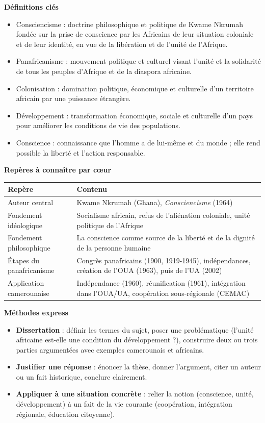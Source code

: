 \documentclass[11pt]{article}
\newcommand{\cle}[1]{{\popxbold\color{popdark}#1}}
\begin{document}
\begin{aretenir}
\textbf{Définitions clés}
\begin{itemize}
  \item \cle{Consciencisme} : doctrine philosophique et politique de Kwame Nkrumah fondée sur la prise de conscience par les Africains de leur situation coloniale et de leur identité, en vue de la libération et de l'unité de l'Afrique.
  \item \cle{Panafricanisme} : mouvement politique et culturel visant l'unité et la solidarité de tous les peuples d'Afrique et de la diaspora africaine.
  \item \cle{Colonisation} : domination politique, économique et culturelle d'un territoire africain par une puissance étrangère.
  \item \cle{Développement} : transformation économique, sociale et culturelle d'un pays pour améliorer les conditions de vie des populations.
  \item \cle{Conscience} : connaissance que l'homme a de lui-même et du monde ; elle rend possible la liberté et l'action responsable.
\end{itemize}

\textbf{Repères à connaître par c\oe ur}
\begin{center}
\begin{tabularx}{\linewidth}{|l|X|}\hline
\rowcolor{popblueL} \textbf{Repère} & \textbf{Contenu} \\ \hline
Auteur central & Kwame Nkrumah (Ghana), \emph{Consciencisme} (1964) \\ \hline
Fondement idéologique & Socialisme africain, refus de l'aliénation coloniale, unité politique de l'Afrique \\ \hline
Fondement philosophique & La conscience comme source de la liberté et de la dignité de la personne humaine \\ \hline
Étapes du panafricanisme & Congrès panafricains (1900, 1919-1945), indépendances, création de l'OUA (1963), puis de l'UA (2002) \\ \hline
Application camerounaise & Indépendance (1960), réunification (1961), intégration dans l'OUA/UA, coopération sous-régionale (CEMAC) \\ \hline
\end{tabularx}
\end{center}

\textbf{Méthodes express}
\begin{itemize}
  \item \textbf{Dissertation} : définir les termes du sujet, poser une problématique (l'unité africaine est-elle une condition du développement ?), construire deux ou trois parties argumentées avec exemples camerounais et africains.
  \item \textbf{Justifier une réponse} : énoncer la thèse, donner l'argument, citer un auteur ou un fait historique, conclure clairement.
  \item \textbf{Appliquer à une situation concrète} : relier la notion (conscience, unité, développement) à un fait de la vie courante (coopération, intégration régionale, éducation citoyenne).
\end{itemize}
\end{aretenir}
\end{document}
